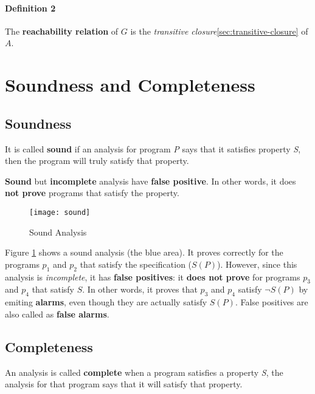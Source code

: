 \paragraph{Definition 2}

The \textbf{reachability relation} of $G$ is the \textit{transitive
  closure}\ref{sec:transitive-closure} of $A$.




\newpage
\section{Soundness and Completeness}

\subsection{Soundness}


It is called \textbf{sound} if an analysis for program \textsl{P} says
that it satisfies property \textsl{S}, then the program will truly
satisfy that property.

\textbf{Sound} but \textbf{incomplete} analysis have \textbf{false
  positive}. In other words, it does \textbf{not prove} programs that
satisfy the property.

\begin{figure}[h]
  \texttt{[image: sound]}
  \caption{Sound Analysis}
  \label{fig:sound}
\end{figure}

Figure \ref{fig:sound} shows a sound analysis (the blue area). It
proves correctly for the programs $ p_1 $ and $ p_2 $ that satisfy the
specification ($S(P)$). However, since this analysis is
\textit{incomplete}, it has \textbf{false positives}: it \textbf{does
  not prove} for programs $ p_3 $ and $ p_4 $ that satisfy $S$. In
other words, it proves that $ p_3 $ and $ p_4 $ satisfy $ \neg S(P) $
by emiting \textbf{alarms}, even though they are actually satisfy
$ S(P) $. False positives are also called as \textbf{false alarms}.

\subsection{Completeness}

An analysis is called \textbf{complete} when a program satisfies a
property \textsl{S}, the analysis for that program says that it will
satisfy that property.


